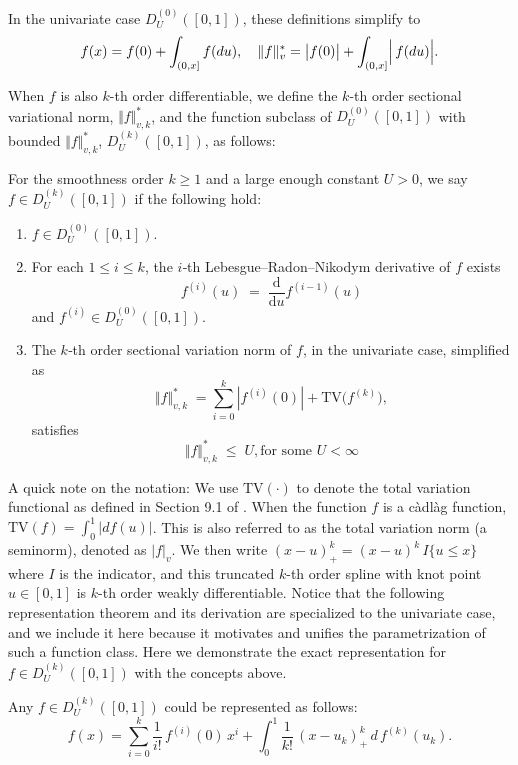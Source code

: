 In the univariate case $D^{(0)}_U([0,1])$, these definitions simplify to
\begin{align}
    f(x)
  = f(0) + \int_{(0,x]} f(du),
  \quad
  \Vert f \Vert_v^*
  = \bigl|f(0)\bigr|
    + \int_{(0,x]}
      \Bigl|\,f(du)\Bigr|.
\end{align}

When \(f\) is also $k$-th order differentiable, we define the $k$-th order sectional variational norm, \( \Vert f \Vert_{v,k}^*\), and the function subclass of $D^{(0)}_U([0,1])$ with bounded \( \Vert f \Vert_{v,k}^*\), $D^{(k)}_U([0,1])$, as follows: 

\begin{definition}\label{assump:DkM}
For the smoothness order $k\ge1$ and a large enough constant $U>0$, we say $f\in D^{(k)}_U([0,1])$ if the following hold:
\begin{enumerate}
  \item $f\in D^{(0)}_U([0,1])$.
  \item For each $1\le i\le k$, the $i$‑th Lebesgue–Radon–Nikodym derivative of $f$ exists
    \[
      f^{(i)}(u)\;=\;\frac{\mathrm{d}}{\mathrm{d}u}f^{(i-1)}(u)
    \]
    and $f^{(i)}\in D^{(0)}_U([0,1])$.
  \item The $k$‑th order sectional variation norm of $f$,
    in the univariate case, simplified as
    \[
      \Vert f \Vert_{v,k}^*
      \;=\sum_{i=0}^k |f^{(i)}(0)| + \mathrm{TV}\bigl(f^{(k)}\bigr),
    \]
    satisfies
    \[
      \Vert f \Vert_{v,k}^* \;\le\; U, \text{for some $U < \infty$}
    \]
\end{enumerate}
\end{definition}
A quick note on the notation: We use $\mathrm{TV}(\cdot)$ to denote the total variation functional as defined in Section 9.1 of \citet{tibshirani2022divided}. When the function $f$ is a càdlàg function, $\mathrm{TV}(f) = \int_0^1 |df(u)|$. This is also referred to as the total variation norm (a seminorm), denoted as $|f|_v$. We then write $(x - u)_+^k = (x - u)^k\,I\{u\le x\}$ where $I$ is the indicator, and this truncated $k$-th order spline with knot point $u \in [0,1]$ is $k$-th order weakly differentiable. Notice that the following representation theorem and its derivation are specialized to the univariate case, and we include it here because it motivates and unifies the parametrization of such a function class. Here we demonstrate the exact representation for $f\in D^{(k)}_U([0,1])$ with the concepts above. 
\begin{proposition}
\label{thm:HAL_representation}

Any $f\in D^{(k)}_U([0,1])$ could be represented as follows:
\[
  f(x)
  = \sum_{i=0}^k \frac{1}{i!}\,f^{(i)}(0)\,x^i
    + \int_0^1 \frac{1}{k!}\,(x-u_k)_+^k \,d\,f^{(k)}(u_k).
\]
\end{proposition}

